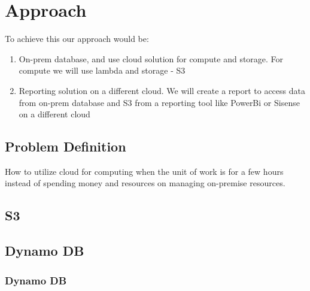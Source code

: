 \chapter{Approach}\label{chap:approach}

To achieve this our approach would be:

\begin{enumerate}
 \item On-prem database, and use cloud solution for compute and storage. For compute we will use lambda and storage - S3
 \item Reporting solution on a different cloud. We will create a report to access data from on-prem database and S3 from a reporting tool like PowerBi or Sisense on a different cloud
 \end{enumerate} 

\section{Problem Definition}

How to utilize cloud for computing when the unit of work is for a few hours instead of spending money and resources on managing on-premise resources.

\section{S3}


\section{Dynamo DB}


\subsection*{Dynamo DB}
